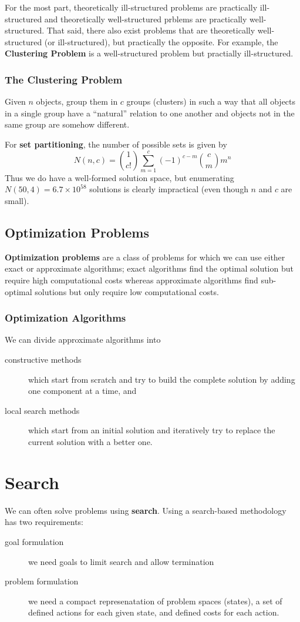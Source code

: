 \documentclass[12pt]{article}
\begin{document}
For the most part, theoretically ill-structured problems are practically ill-structured and theoretically well-structured prblems are practically well-structured. That said, there also exist problems that are theoretically well-structured (or ill-structured), but practically the opposite. For example, the {\bf Clustering Problem} is a well-structured problem but practially ill-structured.

\subsubsection{The Clustering Problem}
Given $n$ objects, group them in $c$ groups (clusters) in such a way that all objects in a single group have a ``natural'' relation to one another and objects not in the same group are somehow different.

For {\bf set partitioning}, the number of possible sets is given by \[ N(n,c) = \binom{1}{c!}\sum_{m=1}^c (-1)^{c-m} \binom{c}{m} m^n \] Thus we do have a well-formed solution space, but enumerating $N(50, 4) = 6.7 \times 10^{58}$ solutions is clearly impractical (even though $n$ and $c$ are small).

\subsection{Optimization Problems}
{\bf Optimization problems} are a class of problems for which we can use either exact or approximate algorithms; exact algorithms find the optimal solution but require high computational costs whereas approximate algorithms find sub-optimal solutions but only require low computational costs.

\subsubsection{Optimization Algorithms}
We can divide approximate algorithms into
\begin{description}
\item [constructive methods] which start from scratch and try to build the complete solution by adding one component at a time, and
\item [local search methods] which start from an initial solution and iteratively try to replace the current solution with a better one.
\end{description}

\section{Search}
We can often solve problems using {\bf search}. Using a search-based methodology has two requirements:
\begin{description}
\item[goal formulation] we need goals to limit search and allow termination
\item[problem formulation] we need a compact represenatation of problem spaces (states), a set of defined actions for each given state, and defined costs for each action.
\end{description}
\end{document}
